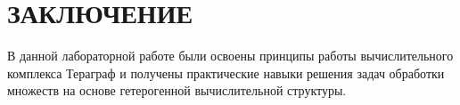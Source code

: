 \section*{ЗАКЛЮЧЕНИЕ}

В данной лабораторной работе были освоены принципы работы вычислительного комплекса Тераграф и получены практические навыки решения задач обработки множеств на основе гетерогенной вычислительной структуры.
